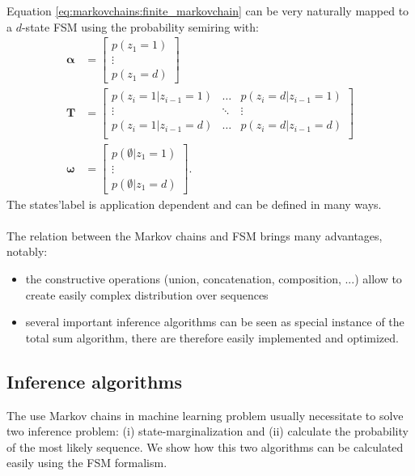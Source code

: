 Equation \ref{eq:markovchains:finite_markovchain} can be very
naturally mapped to a $d$-state FSM using the probability semiring with:
\begin{align}
    \boldsymbol{\alpha} &= \begin{bmatrix}
        p(z_1 = 1) \\
        \vdots \\
        p(z_1 = d)
    \end{bmatrix} \\
    \mathbf{T} &= \begin{bmatrix}
        p(z_i = 1 | z_{i-1} = 1)  & \dots & p(z_i = d | z_{i-1} = 1) \\
        \vdots  & \ddots & \vdots \\
        p(z_i = 1 | z_{i-1} = d)  & \dots & p(z_i = d | z_{i-1} = d) \\
    \end{bmatrix} \\
    \boldsymbol{\omega} &= \begin{bmatrix}
        p(\emptyset | z_1 = 1) \\
        \vdots \\
        p(\emptyset | z_1 = d)
    \end{bmatrix}.
\end{align}
The states'label is application dependent and can be defined in many
ways.

\paragraph{} The relation between the Markov chains and FSM brings many
advantages, notably:
\begin{itemize}
    \item the constructive operations (union, concatenation,
        composition, ...) allow to create easily complex distribution
        over sequences
    \item several important inference algorithms can be seen as special
        instance of the total sum algorithm, there are therefore easily
        implemented and optimized.
\end{itemize}

\subsection{Inference algorithms}

The use Markov chains in machine learning problem usually necessitate
to solve two inference problem: (i) state-marginalization and (ii)
calculate the probability of the most likely sequence. We show how this
two algorithms can be calculated easily using the FSM formalism.

